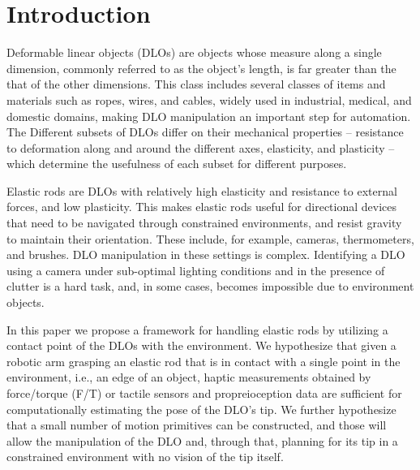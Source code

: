 \section{Introduction}
\label{sec:intro}


Deformable linear objects (DLOs) are objects whose measure along a single dimension, commonly referred to as the object's length, is far greater than the that of the other dimensions. This class includes several classes of items and materials such as ropes, wires, and cables, widely used in industrial, medical, and domestic domains, making DLO manipulation an important step for automation. The Different subsets of DLOs differ on their mechanical properties -- resistance to deformation along and around the different axes, elasticity, and plasticity -- which determine the usefulness of each subset for different purposes. 

Elastic rods are DLOs with relatively high elasticity and resistance to external forces, and low plasticity. This makes elastic rods useful for directional devices that need to be navigated through constrained environments, and resist gravity to maintain their orientation. These include, for example, cameras, thermometers, and brushes. DLO manipulation in these settings is complex. Identifying a DLO using a camera under sub-optimal lighting conditions and in the presence of clutter is a hard task, and, in some cases, becomes impossible due to environment objects.  

In this paper we propose a framework for handling elastic rods by utilizing a contact point of the DLOs with the environment. We hypothesize that given a robotic arm grasping an elastic rod that is in contact with a single point in the environment, i.e., an edge of an object, haptic measurements obtained by force/torque (F/T) or tactile sensors and propreioception data are sufficient for computationally estimating the pose of the DLO's tip. We further hypothesize that a small number of motion primitives can be constructed, and those will allow the manipulation of the DLO and, through that, planning for its tip in a constrained environment with no vision of the tip itself. 

